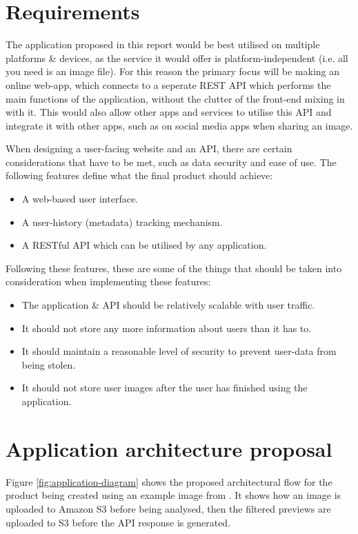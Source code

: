 \documentclass[a4paper,12pt]{report}
\begin{document}
  \section{Requirements} \label{sec:requirements}
    The application proposed in this report would be best utilised on multiple platforms \& devices, as the service it would offer is platform-independent (i.e. all you need is an image file). For this reason the primary focus will be making an online web-app, which connects to a seperate REST \citep{fielding2000architectural} API which performs the main functions of the application, without the clutter of the front-end mixing in with it. This would also allow other apps and services to utilise this API and integrate it with other apps, such as on social media apps when sharing an image.

    When designing a user-facing website and an API, there are certain considerations that have to be met, such as data security and ease of use. The following features define what the final product should achieve:

    \begin{itemize}
      \item A web-based user interface.
      \item A user-history (metadata) tracking mechanism.
      \item A RESTful API which can be utilised by any application.
    \end{itemize}

    Following these features, these are some of the things that should be taken into consideration when implementing these features:

      \begin{itemize}
        \item The application \& API should be relatively scalable with user traffic.
        \item It should not store any more information about users than it has to.
        \item It should maintain a reasonable level of security to prevent user-data from being stolen.
        \item It should not store user images after the user has finished using the application.
      \end{itemize}

  \section{Application architecture proposal}
    Figure \ref{fig:application-diagram} shows the proposed architectural flow for the product being created using an example image from \cite{cat2013image}. It shows how an image is uploaded to Amazon S3 before being analysed, then the filtered previews are uploaded to S3 before the API response is generated.
\end{document}

